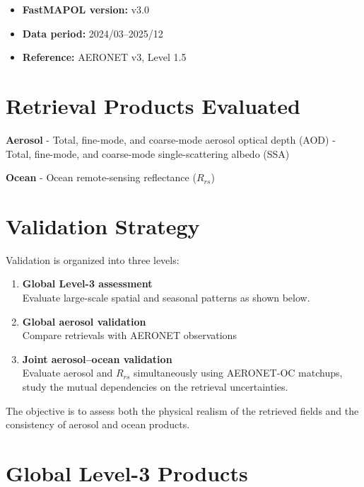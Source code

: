 \documentclass[
  11pt,
  letterpaper,
]{scrreprt}
\providecommand{\tightlist}{%
  \setlength{\itemsep}{0pt}\setlength{\parskip}{0pt}}
\begin{document}
\begin{itemize}
\tightlist
\item
  \textbf{FastMAPOL version:} v3.0\\
\item
  \textbf{Data period:} 2024/03--2025/12\\
\item
  \textbf{Reference:} AERONET v3, Level 1.5
\end{itemize}

\section{Retrieval Products
Evaluated}\label{retrieval-products-evaluated}

\textbf{Aerosol} - Total, fine-mode, and coarse-mode aerosol optical
depth (AOD) - Total, fine-mode, and coarse-mode single-scattering albedo
(SSA)

\textbf{Ocean} - Ocean remote-sensing reflectance (\(R_{rs}\))

\section{Validation Strategy}\label{validation-strategy}

Validation is organized into three levels:

\begin{enumerate}
\def\labelenumi{\arabic{enumi}.}
\item
  \textbf{Global Level-3 assessment}\\
  Evaluate large-scale spatial and seasonal patterns as shown below.
\item
  \textbf{Global aerosol validation}\\
  Compare retrievals with AERONET observations
\item
  \textbf{Joint aerosol--ocean validation}\\
  Evaluate aerosol and \(R_{rs}\) simultaneously using AERONET-OC
  matchups, study the mutual dependencies on the retrieval
  uncertainties.
\end{enumerate}

The objective is to assess both the physical realism of the retrieved
fields and the consistency of aerosol and ocean products.

\section{Global Level-3 Products}\label{global-level-3-products}
\end{document}
